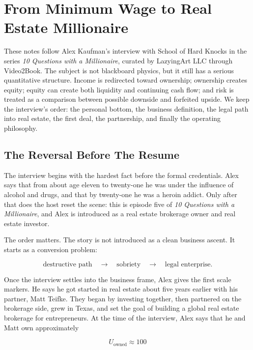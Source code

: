 \chapter{From Minimum Wage to Real Estate Millionaire}

These notes follow Alex Kaufman's interview with School of Hard Knocks in the series \emph{10 Questions with a Millionaire}, curated by LazyingArt LLC through Video2Book. The subject is not blackboard physics, but it still has a serious quantitative structure. Income is redirected toward ownership; ownership creates equity; equity can create both liquidity and continuing cash flow; and risk is treated as a comparison between possible downside and forfeited upside. We keep the interview's order: the personal bottom, the business definition, the legal path into real estate, the first deal, the partnership, and finally the operating philosophy.

\section{The Reversal Before The Resume}

The interview begins with the hardest fact before the formal credentials. Alex says that from about age eleven to twenty-one he was under the influence of alcohol and drugs, and that by twenty-one he was a heroin addict. Only after that does the host reset the scene: this is episode five of \emph{10 Questions with a Millionaire}, and Alex is introduced as a real estate brokerage owner and real estate investor.

The order matters. The story is not introduced as a clean business ascent. It starts as a conversion problem:

\begin{equation}
\text{destructive path}
\quad \longrightarrow \quad
\text{sobriety}
\quad \longrightarrow \quad
\text{legal enterprise}.
\end{equation}

Once the interview settles into the business frame, Alex gives the first scale markers. He says he got started in real estate about five years earlier with his partner, Matt Teifke. They began by investing together, then partnered on the brokerage side, grew in Texas, and set the goal of building a global real estate brokerage for entrepreneurs. At the time of the interview, Alex says that he and Matt own approximately

\begin{equation}
U_{\text{owned}} \approx 100
\end{equation}

